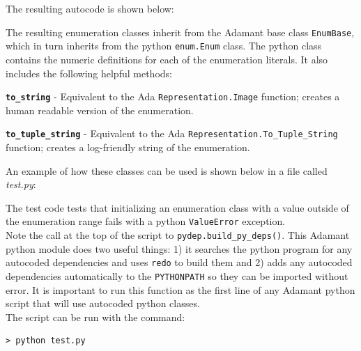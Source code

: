 The resulting autocode is shown below:


The resulting enumeration classes inherit from the Adamant base class \texttt{EnumBase}, which in turn inherits from the python \texttt{enum.Enum} class. The python class contains the numeric definitions for each of the enumeration literals. It also includes the following helpful methods:

\vspace{5mm} %
\begin{spaceditemize}
  \item \textbf{\texttt{to\_string}} - Equivalent to the Ada \texttt{Representation.Image} function; creates a human readable version of the enumeration.
  \item \textbf{\texttt{to\_tuple\_string}} - Equivalent to the Ada \texttt{Representation.To\_Tuple\_String} function; creates a log-friendly string of the enumeration.
\end{spaceditemize}
\vspace{5mm} %

An example of how these classes can be used is shown below in a file called \textit{test.py}:


The test code tests that initializing an enumeration class with a value outside of the enumeration range fails with a python \texttt{ValueError} exception. \\

Note the call at the top of the script to \texttt{pydep.build\_py\_deps()}. This Adamant python module does two useful things: 1) it searches the python program for any autocoded dependencies and uses \texttt{redo} to build them and 2) adds any autocoded dependencies automatically to the \texttt{PYTHONPATH} so they can be imported without error. It is important to run this function as the first line of any Adamant python script that will use autocoded python classes. \\

The script can be run with the command:

\vspace{5mm} %
\begin{verbatim}
> python test.py
\end{verbatim}
\vspace{5mm} %

